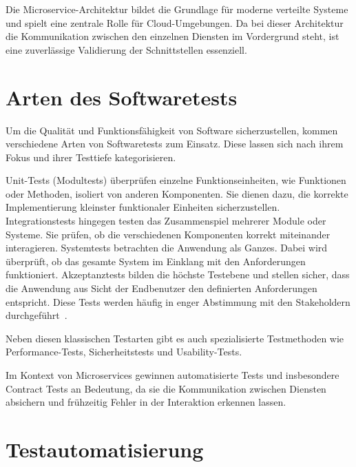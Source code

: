 Die Microservice-Architektur bildet die Grundlage für moderne verteilte Systeme und spielt eine zentrale Rolle für
Cloud-Umgebungen.
Da bei dieser Architektur die Kommunikation zwischen den einzelnen Diensten im Vordergrund steht, ist eine zuverlässige Validierung der Schnittstellen essenziell.


\section{Arten des Softwaretests}\label{sec:testing_types}

Um die Qualität und Funktionsfähigkeit von Software sicherzustellen, kommen verschiedene Arten von Softwaretests zum Einsatz.
Diese lassen sich nach ihrem Fokus und ihrer Testtiefe kategorisieren.

Unit-Tests (Modultests) überprüfen einzelne Funktionseinheiten, wie Funktionen oder Methoden, isoliert von anderen Komponenten.
Sie dienen dazu, die korrekte Implementierung kleinster funktionaler Einheiten sicherzustellen.
Integrationstests hingegen testen das Zusammenspiel mehrerer Module oder Systeme.
Sie prüfen, ob die verschiedenen Komponenten korrekt miteinander interagieren.
Systemtests betrachten die Anwendung als Ganzes.
Dabei wird überprüft, ob das gesamte System im Einklang mit den Anforderungen funktioniert.
Akzeptanztests bilden die höchste Testebene und stellen sicher, dass die Anwendung aus Sicht der Endbenutzer den definierten Anforderungen entspricht.
Diese Tests werden häufig in enger Abstimmung mit den Stakeholdern durchgeführt~\cite{singhSoftwareTesting2011}.

Neben diesen klassischen Testarten gibt es auch spezialisierte Testmethoden wie Performance-Tests, Sicherheitstests und Usability-Tests.

Im Kontext von Microservices gewinnen automatisierte Tests und insbesondere Contract Tests an Bedeutung, da sie die Kommunikation zwischen Diensten absichern und frühzeitig Fehler in der Interaktion erkennen lassen.

\section{Testautomatisierung}\label{sec:test_automation}
